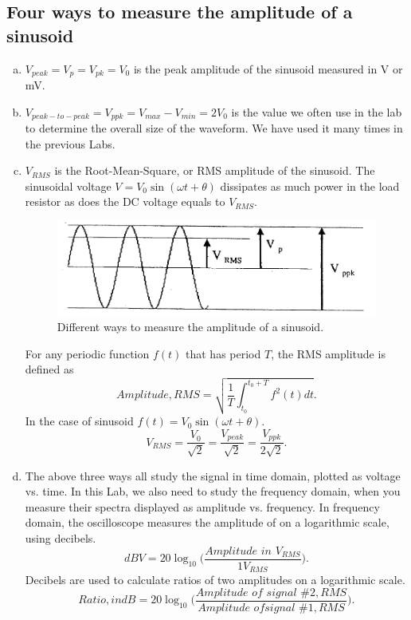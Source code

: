 \documentclass{article}
\begin{document}
\subsection{Four ways to measure the amplitude of a sinusoid}
\begin{enumerate}[a)]
    \item $V_{peak}=V_p=V_{pk}=V_0$ is the peak amplitude of the sinusoid measured in V or mV.
    \item $V_{peak-to-peak}=V_{ppk}=V_{max}-V_{min}=2V_0$ is the value we often use in the lab to determine the overall size of the waveform. We have used it many times in the previous Labs.
    \item $V_{RMS}$ is the Root-Mean-Square, or RMS amplitude of the sinusoid. The sinusoidal voltage $V = V_0\sin(\omega t+\theta)$ dissipates as much power in the load resistor as does the DC voltage equals to $V_{RMS}$.

          \begin{figure}[H]\centering
              \includegraphics[scale=1.0]{V.png}
              \caption{Different ways to measure the amplitude of a sinusoid.}
          \end{figure}

          For any periodic function $f(t)$ that has period $T$, the RMS amplitude is defined as
          $$Amplitude, RMS = \sqrt{\frac{1}{T}\int^{t_0+T}_{t_0}f^2(t)dt}.$$
          In the case of sinusoid $f(t) = V_0\sin(\omega t+\theta)$.
          $$V_{RMS} = \frac{V_0}{\sqrt{2}} = \frac{V_{peak}}{\sqrt{2}} = \frac{V_{ppk}}{2\sqrt{2}}.$$
    \item The above three ways all study the signal in time domain, plotted as voltage vs. time. In this Lab, we also need to study the frequency domain, when you measure their spectra displayed as amplitude vs. frequency. In frequency domain, the oscilloscope measures the amplitude of on a logarithmic scale, using decibels.
          $$dBV = 20\log_{10}\bigg(\frac{Amplitude\,\,in\,\,V_{RMS}}{1V_{RMS}}\bigg).$$
          Decibels are used to calculate ratios of two amplitudes on a logarithmic scale.
          $$Ratio, in dB = 20\log_{10}\bigg(\frac{Amplitude\,\,of\,\,signal\,\,\#2,RMS}{Amplitude\,\,of signal\,\,\#1,RMS}\bigg).$$
\end{enumerate}
\end{document}

